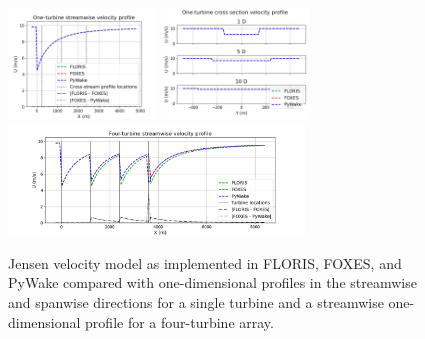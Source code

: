 \documentclass{iopconfser}
\begin{document}
\begin{figure}[]
\centering
\includegraphics[width=0.35\textwidth]{figures/jensen 1t x.png}
\includegraphics[width=0.35\textwidth]{figures/jensen 1t y.png}
\\
\includegraphics[width=0.7\textwidth]{figures/jensen 4t.png}
\caption{Jensen velocity model as implemented in FLORIS, FOXES, and PyWake compared with one-dimensional profiles in the streamwise and spanwise directions for a single turbine and a streamwise one-dimensional profile for a four-turbine array.}
\label{fig:jensen}
\end{figure}
\end{document}
